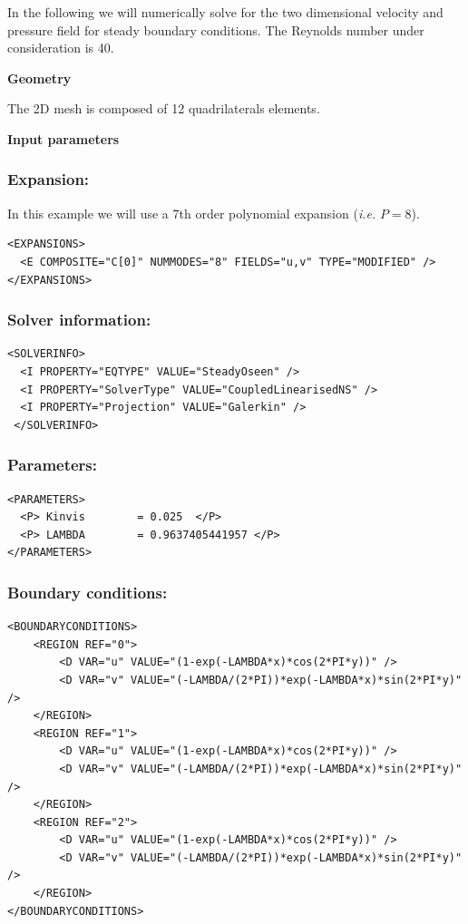 In the following we will numerically solve for the two dimensional velocity and pressure field for steady boundary conditions. The Reynolds number under consideration is 40.

\textbf{Geometry}

The 2D mesh is composed of 12 quadrilaterals elements.

\textbf{Input parameters}

\subsubsection{Expansion:~}
In this example we will use a 7th order polynomial expansion (\textit{i.e.} $P=8$).
\begin{lstlisting}[style=XMLStyle]
<EXPANSIONS>
  <E COMPOSITE="C[0]" NUMMODES="8" FIELDS="u,v" TYPE="MODIFIED" />
</EXPANSIONS>
\end{lstlisting}

\subsubsection{Solver information:~}
\begin{lstlisting}[style=XMLStyle]
<SOLVERINFO>
  <I PROPERTY="EQTYPE" VALUE="SteadyOseen" />
  <I PROPERTY="SolverType" VALUE="CoupledLinearisedNS" />
  <I PROPERTY="Projection" VALUE="Galerkin" />
 </SOLVERINFO>
\end{lstlisting}

\subsubsection{Parameters:~}
\begin{lstlisting}[style=XMLStyle]
<PARAMETERS>
  <P> Kinvis        = 0.025  </P>
  <P> LAMBDA        = 0.9637405441957 </P>
</PARAMETERS>
\end{lstlisting}

\subsubsection{Boundary conditions:~}
\begin{lstlisting}[style=XMLStyle]
<BOUNDARYCONDITIONS>
	<REGION REF="0">
		<D VAR="u" VALUE="(1-exp(-LAMBDA*x)*cos(2*PI*y))" />
        <D VAR="v" VALUE="(-LAMBDA/(2*PI))*exp(-LAMBDA*x)*sin(2*PI*y)" />
    </REGION>
    <REGION REF="1">
		<D VAR="u" VALUE="(1-exp(-LAMBDA*x)*cos(2*PI*y))" />
		<D VAR="v" VALUE="(-LAMBDA/(2*PI))*exp(-LAMBDA*x)*sin(2*PI*y)" />
	</REGION>
	<REGION REF="2">
		<D VAR="u" VALUE="(1-exp(-LAMBDA*x)*cos(2*PI*y))" />
		<D VAR="v" VALUE="(-LAMBDA/(2*PI))*exp(-LAMBDA*x)*sin(2*PI*y)" />
	</REGION>
</BOUNDARYCONDITIONS>
\end{lstlisting}

